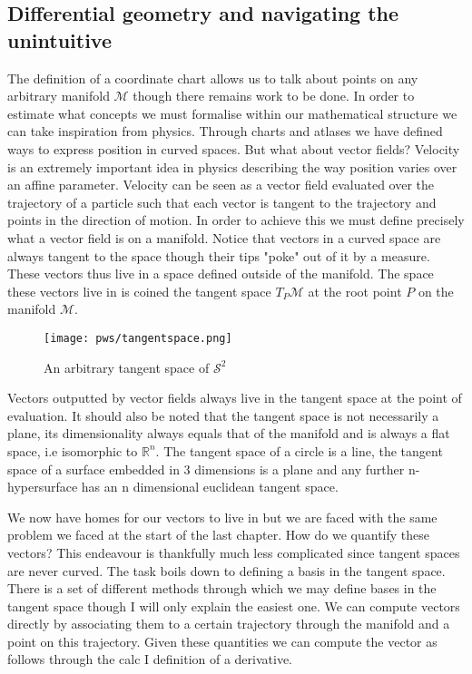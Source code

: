 \documentclass{article}
\begin{document}
  \subsection{Differential geometry and navigating the unintuitive}

  The definition of a coordinate chart allows us to talk about points on any arbitrary manifold $\mathcal M$ though there remains work to be done. In order to estimate what concepts we must formalise within our mathematical structure we can take inspiration from physics. Through charts and atlases we have defined ways to express position in curved spaces. But what about vector fields? Velocity is an extremely important idea in physics describing the way position varies over an affine parameter. Velocity can be seen as a vector field evaluated over the trajectory of a particle such that each vector is tangent to the trajectory and points in the direction of motion. In order to achieve this we must define precisely what a vector field is on a manifold. Notice that vectors in a curved space are always tangent to the space though their tips "poke" out of it by a measure. These vectors thus live in a space defined outside of the manifold. The space these vectors live in is coined the tangent space $T_P \mathcal M$ at the root point $P$ on the manifold $\mathcal M$. 

  \begin{figure}[b!]
    \centering
    \texttt{[image: pws/tangentspace.png]}
    \caption{An arbitrary tangent space of $\mathcal S^2$}
    \label{fig:tanspace1}
  \end{figure}

  Vectors outputted by vector fields always live in the tangent space at the point of evaluation. It should also be noted that the tangent space is not necessarily a plane, its dimensionality always equals that of the manifold and is always a flat space, i.e isomorphic to $\mathbb R^n$. The tangent space of a circle is a line, the tangent space of a surface embedded in 3 dimensions is a plane and any further n-hypersurface has an n dimensional euclidean tangent space. 

  We now have homes for our vectors to live in but we are faced with the same problem we faced at the start of the last chapter. How do we quantify these vectors? This endeavour is thankfully much less complicated since tangent spaces are never curved. The task boils down to defining a basis in the tangent space. There is a set of different methods through which we may define bases in the tangent space though I will only explain the easiest one. We can compute vectors directly by associating them to a certain trajectory through the manifold and a point on this trajectory. Given these quantities we can compute the vector as follows through the calc I definition of a derivative. 
\end{document}
